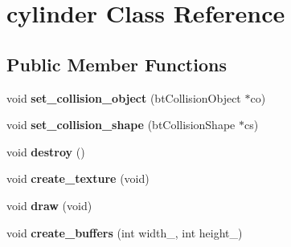 \hypertarget{classcylinder}{\section{cylinder Class Reference}
\label{classcylinder}
}
\subsection*{Public Member Functions}
\begin{DoxyCompactItemize}
\item 
\hypertarget{classcylinder_ac7bbe660ca3a3241b56a6b15023b646d}{void {\bfseries set\+\_\+collision\+\_\+object} (bt\+Collision\+Object $\ast$co)}\label{classcylinder_ac7bbe660ca3a3241b56a6b15023b646d}

\item 
\hypertarget{classcylinder_ac2847fbe8bc2cf0a9c791d050d414bde}{void {\bfseries set\+\_\+collision\+\_\+shape} (bt\+Collision\+Shape $\ast$cs)}\label{classcylinder_ac2847fbe8bc2cf0a9c791d050d414bde}

\item 
\hypertarget{classcylinder_af6900cdc417498d865e1bc36f5c6a57f}{void {\bfseries destroy} ()}\label{classcylinder_af6900cdc417498d865e1bc36f5c6a57f}

\item 
\hypertarget{classcylinder_af0201c439cf140ae9016cae3df47677f}{void {\bfseries create\+\_\+texture} (void)}\label{classcylinder_af0201c439cf140ae9016cae3df47677f}

\item 
\hypertarget{classcylinder_a8193eaa5b74abc2aa089f474592d0412}{void {\bfseries draw} (void)}\label{classcylinder_a8193eaa5b74abc2aa089f474592d0412}

\item 
\hypertarget{classcylinder_a760def4d3e8c0cd263b11dfa1060b645}{void {\bfseries create\+\_\+buffers} (int width\+\_\+, int height\+\_\+)}\label{classcylinder_a760def4d3e8c0cd263b11dfa1060b645}

\end{DoxyCompactItemize}
